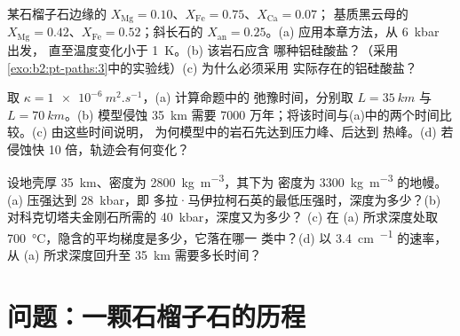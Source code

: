 \begin{exercise}[$\star\star\star$]\label{exo:b2:pt-paths:10}
某石榴子石边缘的 $X_{\text{Mg}} = 0.10$、$X_{\text{Fe}} = 0.75$、$X_{\text{Ca}} = 0.07$；
基质黑云母的 $X_{\text{Mg}} = 0.42$、$X_{\text{Fe}} = 0.52$；斜长石的
$X_{\text{an}} = 0.25$。(a) 应用本章方法，从 \qty{6}{kbar} 出发，
直至温度变化小于 \qty{1}{K}。(b) 该岩石应含
哪种铝硅酸盐？（采用\cref{exo:b2:pt-paths:3}中的实验线）(c) 为什么必须采用
实际存在的铝硅酸盐？
\end{exercise}

\begin{exercise}[$\star\star\star$]\label{exo:b2:pt-paths:11}
取 $\kappa = \qty{1e-6}{m^2.s^{-1}}$，(a) 计算命题中的
弛豫时间，分别取 $L = \qty{35}{km}$ 与 $L = \qty{70}{km}$。(b) 模型侵蚀
\qty{35}{km} 需要 7000 万年；将该时间与(a)中的两个时间比较。(c) 由这些时间说明，
为何模型中的岩石先达到压力峰、后达到
热峰。(d) 若侵蚀快 10 倍，轨迹会有何变化？
\end{exercise}

\begin{exercise}[$\star\star\star$]\label{exo:b2:pt-paths:12}
设地壳厚 \qty{35}{km}、密度为 \qty{2800}{kg.m^{-3}}，其下为
密度为 \qty{3300}{kg.m^{-3}} 的地幔。(a) 压强达到 \qty{28}{kbar}，即
多拉·马伊拉柯石英的最低压强时，深度为多少？(b) 对科克切塔夫金刚石所需的 \qty{40}{kbar}，深度又为多少？
(c) 在 (a) 所求深度处取 \qty{700}{\celsius}，隐含的平均梯度是多少，它落在哪一
类中？(d) 以 \qty{3.4}{cm.^{-1}} 的速率，从
(a) 所求深度回升至 \qty{35}{km} 需要多长时间？
\end{exercise}

\section{问题：一颗石榴子石的历程}

